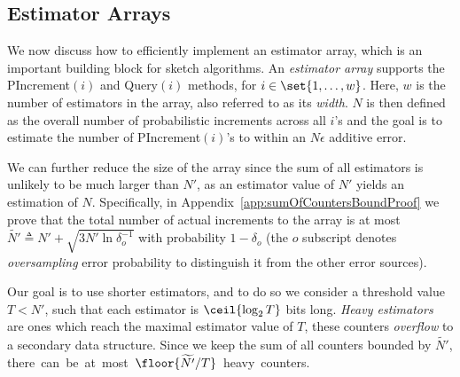 \subsection{Estimator Arrays}
We now discuss how to efficiently implement an estimator array, which is an important building block for sketch algorithms. 
An \emph{estimator array} supports the {\sc PIncrement}$(i)$ and {\sc Query}$(i)$ methods, for $i\in\set{1,\ldots,w}$. Here, $w$ is the number of estimators in the array, also referred to as its \emph{width}.
$N$ is then defined as the overall number of probabilistic increments across all $i$'s and the goal is to estimate the number of {\sc PIncrement}$(i)$'s to within an $N\epsilon$ additive error.

We can further reduce the size of the array since the sum of all
estimators is unlikely to be much larger than $N'$, as an estimator value of $N'$ yields an estimation of $N$. 
Specifically, in Appendix~\ref{app:sumOfCountersBoundProof} we prove that the total number of actual increments to the array is at most $\widetilde{N'}\triangleq N'+\sqrt{3N'\ln\delta_o^{-1}}$ with probability $1-\delta_o$ (the $o$ subscript denotes \emph{oversampling} error probability to distinguish it from the other error sources).

Our goal is to use shorter estimators, and to do so we consider a threshold value $T<N'$, such that each estimator is $\ceil{\log_2 T}$ bits long. \emph{Heavy estimators} are ones which reach the maximal estimator value of $T$, these counters \emph{overflow} to a secondary data structure. Since we keep the sum of all counters bounded by $\widetilde{N'}$, \mbox{there can be at most $\floor{\widetilde{N'}/T}$ heavy counters.}

